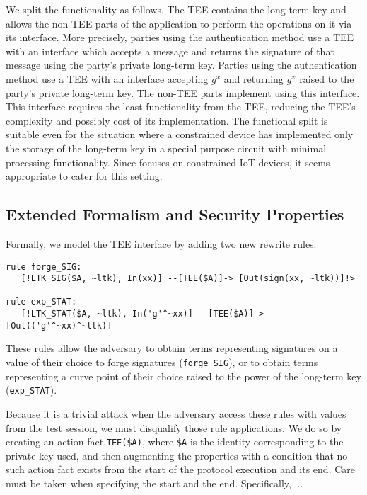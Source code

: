 \documentclass[runningheads]{llncs}
\begin{document}
We split the \mEdhoc{} functionality as follows.
%
The TEE contains the long-term key and allows the non-TEE parts of the
application to perform the operations on it via its interface.
%
More precisely, parties using the \mSig{} authentication method use a TEE with
an interface which accepts a message and returns the signature of that message
using the party's private long-term key.
%
Parties using the \mStat{} authentication method use a TEE with an interface
accepting $g^x$ and returning $g^x$ raised to the party's private long-term key.
%
The non-TEE parts implement \mEdhoc{} using this interface.
%
This interface requires the least functionality from the TEE, reducing the TEE's
complexity and possibly cost of its implementation.
%
The functional split is suitable even for the situation where a
constrained device has implemented only the storage of the long-term key in a
special purpose circuit with minimal processing functionality.
%
Since \mEdhoc{} focuses on constrained IoT devices, it seems appropriate to
cater for this setting.
%

\subsection{Extended Formalism and Security Properties}
\label{sec:TEE:fmAndProps}
Formally, we model the TEE interface by adding two new rewrite rules:
%
\begin{small}
\begin{verbatim}
rule forge_SIG:
   [!LTK_SIG($A, ~ltk), In(xx)] --[TEE($A)]-> [Out(sign(xx, ~ltk))]!>

rule exp_STAT:
   [!LTK_STAT($A, ~ltk), In('g'^~xx)] --[TEE($A)]-> [Out(('g'^~xx)^~ltk)]
\end{verbatim}
\end{small}
%
These rules allow the adversary to obtain terms representing signatures on a
value of their choice to forge signatures (\verb|forge_SIG|), or to obtain terms
representing a curve point of their choice raised to the power of the
long-term key (\verb|exp_STAT|).
%

Because it is a trivial attack when the adversary access these rules with values
from the test session, we must disqualify those rule applications.
%
We do so by creating an action fact \verb|TEE($A)|, where \verb|$A| is the
identity corresponding to the private key used, and then augmenting the
properties with a condition that no such action fact exists from the start of
the protocol execution and its end.
%
Care must be taken when specifying the start and the end.
%
Specifically, ...
\end{document}
